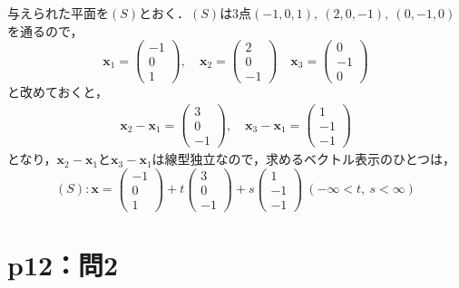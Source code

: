 \begin{tanswer}
  与えられた平面を$(S)$とおく．$(S)$は3点$(-1,0,1),~(2,0,-1),~(0,-1,0)$を通るので，
  \begin{equation*}
    \bm{x}_1=
    \begin{pmatrix}
      -1 \\
      0  \\
      1
    \end{pmatrix}
    ,\quad \bm{x}_2=
    \begin{pmatrix}
      2 \\
      0 \\
      -1
    \end{pmatrix}
    \quad
    \bm{x}_3=
    \begin{pmatrix}
      0  \\
      -1 \\
      0
    \end{pmatrix}
  \end{equation*}
  と改めておくと，
  \begin{gather*}
    \bm{x}_2 - \bm{x}_1 =
    \begin{pmatrix}
      3 \\
      0 \\
      -1
    \end{pmatrix}
    ,\quad
    \bm{x}_3 - \bm{x}_1 =
    \begin{pmatrix}
      1  \\
      -1 \\
      -1
    \end{pmatrix}
  \end{gather*}
  となり，$\bm{x}_2 - \bm{x}_1$と$\bm{x}_3 - \bm{x}_1$は線型独立なので，求めるベクトル表示のひとつは，
  \[
    (S) \colon \bm{x}=
    \begin{pmatrix}
      -1 \\
      0  \\
      1
    \end{pmatrix}
    + t
    \begin{pmatrix}
      3 \\
      0 \\
      -1
    \end{pmatrix}
    +s
    \begin{pmatrix}
      1  \\
      -1 \\
      -1
    \end{pmatrix}
    ~( -\infty < t,~s<\infty)
  \]
\end{tanswer}
%
%
%
%
\section*{p12：問2}

